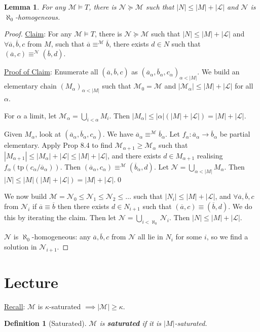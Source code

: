 \documentclass[]{article}
\theoremstyle{custhm}
\theoremstyle{cusdef}
\newtheorem{defin}[theorem]{Definition}
\theoremstyle{custhm}
\newtheorem{lemma}[theorem]{Lemma}
\theoremstyle{custhm}
\theoremstyle{custhm}
\theoremstyle{ex}
\theoremstyle{custhm}
\theoremstyle{cusdef}
\theoremstyle{remark}
\theoremstyle{remark}
\theoremstyle{numremark}
\newcommand{\ra}{\rightarrow}
\newcommand{\undf}[1]{\textit{\textbf{#1}}}
\renewcommand{\L}{\mathcal{L}}
\newcommand{\M}{\mathcal{M}}
\renewcommand{\bar}{\overline}
\newcommand{\tp}{\textrm{tp}}
\newcommand{\N}{\mathcal{N}}
\begin{document}
\begin{lemma}
For any $\M\models T$, there is $\N\succeq\M$ such that $|N|\le |M| + |\L|$ and $\N$ is $\aleph_0$-homogeneous.
\end{lemma}
\begin{proof}
\underline{Claim}: For any $\M\models T$, there is $\N\succeq \M$ such that $|N|\le |M|+|\L|$ and $\forall \bar{a},\bar{b},c$ from $M$, such that $\bar{a}\equiv^\M\bar{b}$, there exists $d\in N$ such that $(\bar{a},c) \equiv^\N(\bar{b},d)$.

\underline{Proof of Claim}: Enumerate all $(\bar{a},\bar{b},c)$ as $(\bar{a}_\alpha,\bar{b}_\alpha,c_\alpha)_{\alpha < |M|}$. We build an elementary chain $(M_\alpha)_{\alpha < |M|}$ such that $\M_0 = \M$ and $|\M_\alpha| \le |M| + |\L|$ for all $\alpha$.

For $\alpha$ a limit, let $\M_\alpha = \bigcup_{i<\alpha}M_i$. Then $|M_\alpha| \le |\alpha|(|M|+|\L|) = |M| + |\L|$.

Given $M_\alpha$, look at $(\bar{a}_\alpha,\bar{b}_\alpha,c_\alpha)$. We have $\bar{a}_\alpha \equiv^\M\bar{b}_\alpha$. Let $f_\alpha : \bar{a}_\alpha \ra \bar{b}_\alpha$ be partial elementary. Apply Prop 8.4 to find $\M_{\alpha+1} \ge \M_\alpha$ such that $|M_{\alpha+1}|\le |M_\alpha| + |\L| \le |M| + |\L|$, and there exists $d \in M_{\alpha+1}$ realising $f_\alpha(\tp(c_\alpha/\bar{a}_\alpha))$. Then $(\bar{a}_\alpha,c_\alpha) \equiv^\M(\bar{b}_\alpha,d)$. Let $\N = \bigcup_{\alpha < |M|}M_\alpha$. Then $|N| \le |M|(|M|+|\L|) = |M| + |\L|$.\qed

We now build $\M = \N_0 \le \N_1\le \N_2\le \dots$ such that $|N_i| \le |M|+|\L|$, and $\forall \bar{a},\bar{b},c$ from $\N_i$ if $\bar{a}\equiv \bar{b}$ then there exists $d\in N_{i+1}$ such that $(\bar{a},c) \equiv (\bar{b},d)$. We do this by iterating the claim. Then let $\N = \bigcup_{i<\aleph_0}\N_i$. Then $|N|\le |M| + |\L|$.

$\N$ is $\aleph_0$-homogeneous: any $\bar{a},\bar{b},c$ from $\N$ all lie in $N_i$ for some $i$, so we find a solution in $\N_{i+1}$.
\end{proof}

\section{Lecture}
\underline{Recall}: $\M$ is $\kappa$-saturated $\implies |\M| \ge \kappa$.

\begin{defin}[Saturated]
$\M$ is \undf{saturated} if it is $|M|$-saturated.
\end{defin}
\end{document}
